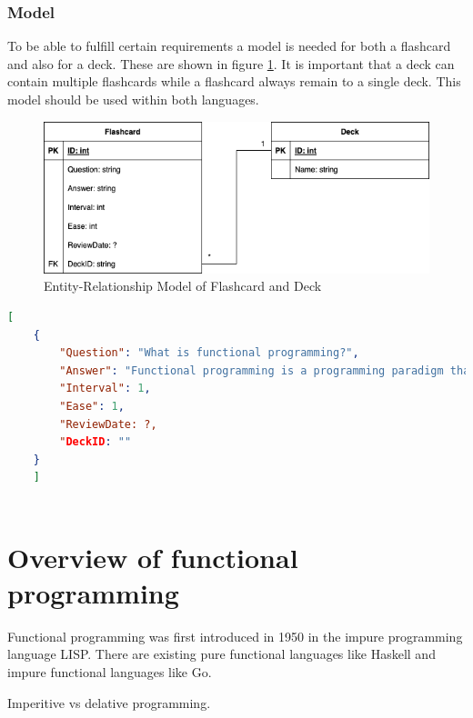     \subsection{Model}
    To be able to fulfill certain requirements a model is needed for both a flashcard and also for a deck. These are shown in figure \ref{fig:er-model}. It is important that a deck can contain multiple flashcards while a flashcard always remain to a single deck. This model should be used within both languages.

    \begin{figure}
        \centering
        \includegraphics[width=1\textwidth]{NerddeckModel.png}
        \caption{Entity-Relationship Model of Flashcard and Deck}
        \label{fig:er-model}
    \end{figure}

    \begin{lstlisting}[language=json,firstnumber=1,float=tp, caption={Example of how a flashcard is saved inside a \ac{json} file}, label=l:flashcardjson]
    [
    {
        "Question": "What is functional programming?",
        "Answer": "Functional programming is a programming paradigm that treats computation as the evaluation of mathematical functions and avoids changing-state and mutable data.",
        "Interval": 1,
        "Ease": 1,
        "ReviewDate: ?,
        "DeckID: ""
    }
    ]
        
    \end{lstlisting}


\chapter{Overview of functional programming}\label{chap:functional-programming}
Functional programming was first introduced in 1950 in the impure programming language LISP. There are existing pure functional languages like Haskell and impure functional languages like Go.

Imperitive vs delative programming.

